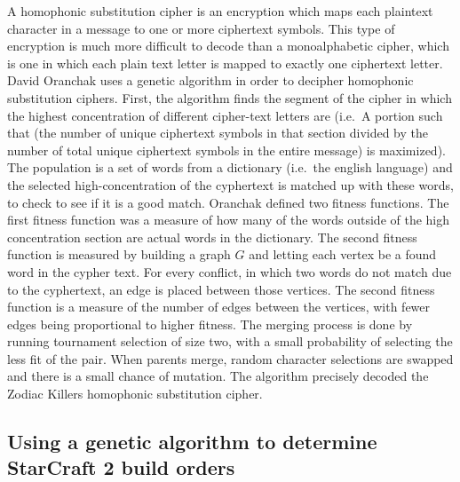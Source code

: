 \documentclass[11pt]{amsart}
\begin{document}
A homophonic substitution cipher is an encryption which maps each plaintext
character in a message to one or more ciphertext symbols.  This type of
encryption is much more difficult to decode than a monoalphabetic cipher, which
is one in which each plain text letter is mapped to exactly one ciphertext
letter.  David Oranchak uses a genetic algorithm in order to decipher
homophonic substitution ciphers.  First, the algorithm finds the segment of the
cipher in which the highest concentration of different cipher-text letters are
(i.e.\ A portion such that (the number of unique ciphertext symbols in that
section divided by the number of total unique ciphertext symbols in the entire
message) is maximized). The population is a set of words from a dictionary
(i.e.\ the english language) and the selected high-concentration of the
cyphertext is matched up with these words, to check to see if it is a good
match.  Oranchak defined two fitness functions.  The first fitness function was
a measure of how many of the words outside of the high concentration section
are actual words in the dictionary.  The second fitness function is measured by
building a graph $G$ and letting each vertex be a found word in the cypher
text.  For every conflict, in which two words do not match due to the
cyphertext, an edge is placed between those vertices.  The second fitness
function is a measure of the number of edges between the vertices, with fewer
edges being proportional to higher fitness.  The merging process is done by
running tournament selection of size two, with a small probability of selecting
the less fit of the pair.  When parents merge, random character selections are
swapped and there is a small chance of mutation.  The algorithm precisely
decoded the Zodiac Killers homophonic substitution cipher.

\subsection*{Using a genetic algorithm to determine StarCraft 2 build orders}
\end{document}
